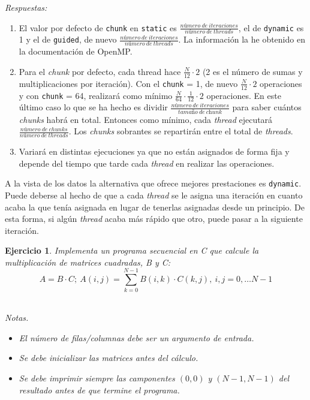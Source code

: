 \documentclass[11pt]{article}
\theoremstyle{definition-style}
\newtheorem{ejer}{Ejercicio}
\begin{document}
\emph{Respuestas:}

\begin{enumerate}[label=\alph*)]
        \item El valor por defecto de \texttt{chunk} en \texttt{static} es $  \frac{número \ de \ iteraciones}{número \ de \ threads}$, el de \texttt{dynamic} es 1 y el de \texttt{guided}, de nuevo $ \frac{número \ de \ iteraciones}{número \ de \ threads}$. La información la he obtenido en la documentación de OpenMP.
        \item Para el \textit{chunk} por defecto, cada thread hace $ \frac{N}{12} \cdot 2$ (2 es el número de sumas y multiplicaciones por iteración). Con el \texttt{chunk} = 1, de nuevo $ \frac{N}{12} \cdot 2$ operaciones y con \texttt{chunk} = 64, realizará como mínimo $\frac{N}{64} \cdot \frac{1}{12} \cdot 2$ operaciones. En este último caso lo que se ha hecho es dividir $\frac{número \ de \ iteraciones}{tamaño \ de \ \textit{chunk}}$ para saber cuántos \textit{chunks} habrá en total. Entonces como mínimo, cada \textit{thread} ejecutará $ \frac{número \ de \ chunks}{número \ de \ threads}$. Los \textit{chunks} sobrantes se repartirán entre el total de \textit{threads}.
        \item Variará en distintas ejecuciones ya que no están asignados de forma fija y depende del tiempo que tarde cada \textit{thread} en realizar las operaciones.
    \end{enumerate}

A la vista de los datos la alternativa que ofrece mejores prestaciones es \texttt{dynamic}. Puede deberse al hecho de que a cada \textit{thread} se le asigna una iteración en cuanto acaba la que tenía asignada en lugar de tenerlas asignadas desde un principio. De esta forma, si algún \textit{thread} acaba más rápido que otro, puede pasar a la siguiente iteración.


\begin{ejer}
    Implementa un programa secuencial en C que calcule la multiplicación de matrices cuadradas, B y C: $$ A = B \cdot C; \ A(i,j) = \sum_{k=0}^{N-1} B(i,k) \cdot C(k,j), \ i,j=0, \hdots N-1$$

    \hfill\\
    \textit{Notas.} \small \begin{itemize}
        \item El número de filas/columnas debe ser un argumento de entrada.
        \item Se debe inicializar las matrices antes del cálculo.
        \item Se debe imprimir siempre las camponentes $(0,0)$ y $(N-1, N-1)$ del resultado antes de que termine el programa.
    \end{itemize} 
\end{ejer}
\end{document}
